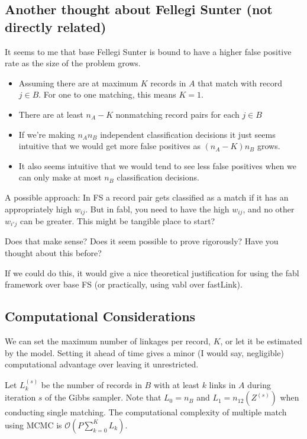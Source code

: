 \documentclass[12pt,letterpaper]{article}
\newcommand{\1}[1]{\mathbb{I}\!\left[#1\right]} %
\begin{document}
\subsection{Another thought about Fellegi Sunter (not directly related)}

It seems to me that base Fellegi Sunter is bound to have a higher false positive rate as the size of the problem grows.

\begin{itemize}
	\item Assuming there are at maximum $K$ records in $A$ that match with record $j \in B$. For one to one matching, this means $K = 1$.
	\item There are at least $n_A - K$ nonmatching record pairs for each $j \in B$
	\item If we're making $n_A n_B$ independent classification decisions it just seems intuitive that we would get more false positives as $(n_A - K) n_B$ grows. 
	\item It also seems intuitive that we would tend to see less false positives when we can only make at most $n_B$ classification decisions. 
\end{itemize}
A possible approach: In FS a record pair gets classified as a match if it has an appropriately high $w_{ij}$. But in fabl, you need to have the high $w_{ij}$, and no other  $w_{i'j}$ can be greater. This might be tangible place to start?

Does that make sense? Does it seem possible to prove rigorously? Have you thought about this before?

If we could do this, it would give a nice theoretical justification for using the fabl framework over base FS (or practically, using vabl over fastLink). 

\subsection{Computational Considerations}
We can set the maximum number of linkages per record, $K$, or let it be estimated by the model. Setting it ahead of time gives a minor (I would say, negligible) computational advantage over leaving it unrestricted. 

Let $L_k^{(s)}$ be the number of records in $B$ with at least $k$ links in $A$ during iteration $s$ of the Gibbs sampler. Note that $L_0 = n_B$ and $L_1 = n_{12}(Z^{(s)})$ when conducting single matching. The computational complexity of multiple match using MCMC is $\mathcal{O} \left(P \sum_{k=0}^K L_k\right)$.
\end{document}
